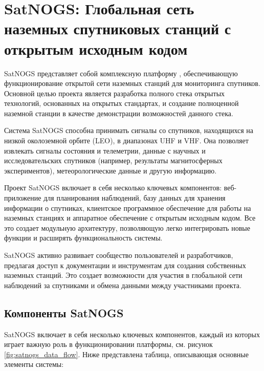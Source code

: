 \chapter{SatNOGS: Глобальная сеть наземных спутниковых станций с открытым исходным кодом}

SatNOGS представляет собой комплексную платформу \cite{satnogs_general_docs},
обеспечивающую функционирование открытой сети наземных станций для мониторинга
спутников. Основной целью проекта является разработка полного стека открытых
технологий, основанных на открытых стандартах, и создание полноценной наземной
станции в качестве демонстрации возможностей данного стека.

Система SatNOGS способна принимать сигналы со спутников, находящихся на низкой
околоземной орбите (LEO), в диапазонах UHF и VHF. Она позволяет извлекать
сигналы состояния и телеметрии, данные с научных и исследовательских спутников
(например, результаты магнитосферных экспериментов), метеорологические данные и
другую информацию.

Проект SatNOGS включает в себя несколько ключевых компонентов: веб-приложение
для планирования наблюдений, базу данных для хранения информации о спутниках,
клиентское программное обеспечение для работы на наземных станциях и аппаратное
обеспечение с открытым исходным кодом. Все это создает модульную архитектуру,
позволяющую легко интегрировать новые функции и расширять функциональность
системы.

SatNOGS активно развивает сообщество пользователей и разработчиков, предлагая
доступ к документации и инструментам для создания собственных наземных станций.
Это создает возможности для участия в глобальной сети наблюдений за спутниками
и обмена данными между участниками проекта.

\section{Компоненты SatNOGS}

SatNOGS включает в себя несколько ключевых компонентов, каждый из которых
играет важную роль в функционировании платформы, см. рисунок
\ref{fig:satnogs_data_flow}.
Ниже представлена таблица, описывающая основные элементы системы:

